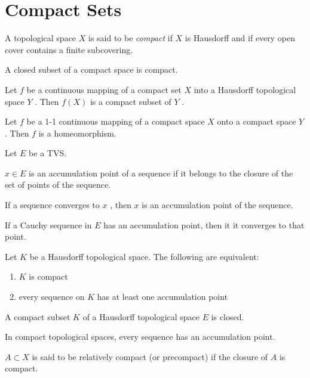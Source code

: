 \section{Compact Sets}

A topological space $ X $ is said to be \textit{compact} if $ X $ is Hausdorff and if every open cover contains a finite subcovering. 

\begin{prop}
	A closed subset of a compact space is compact.
\end{prop}

\begin{prop}
	Let $ f $ be a continuous mapping of a compact set $ X $ into a Hausdorff topological space $ Y $ . Then $ f(X) $ is a compact subset of $ Y $ .
\end{prop}

\begin{prop}
	Let $ f $ be a 1-1 continuous mapping of a compact space $ X $ onto a compact space $ Y $ . Then $ f $ is a homeomorphism.
\end{prop}

Let $ E $ be a TVS.

\begin{defn}
	$ x \in E $ is an accumulation point of a sequence if it belongs to the closure of the set of points of the sequence.
\end{defn}

\begin{prop}
	If a sequence converges to $ x $ , then $ x $ is an accumulation point of the sequence.
\end{prop}

\begin{prop}
	If a Cauchy sequence in $ E $ has an accumulation point, then it it converges to that point.
\end{prop}

\begin{prop}
	Let $ K $ be a Hausdorff topological space. The following are equivalent:
	\begin{enumerate}
		\item $ K $  is compact
		\item every sequence on $ K $ has at least one accumulation point
	\end{enumerate}
\end{prop}

\begin{cor}
	A compact subset $ K $ of a Hausdorff topological space $ E $ is closed.
\end{cor}

\begin{cor}
	In compact topological spaces, every sequence has an accumulation point.
\end{cor}

\begin{defn}
	$ A \subset X $ is said to be relatively compact (or precompact) if the closure of $ A $  is compact.
\end{defn}

